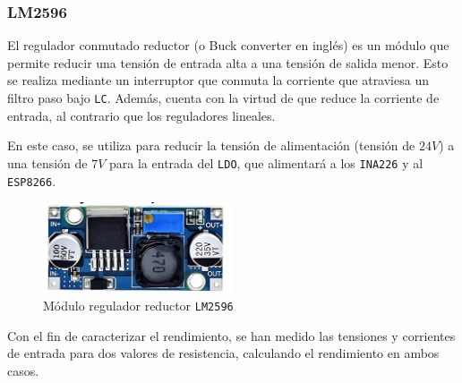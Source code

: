 \subsubsection{LM2596}

El regulador conmutado reductor (o Buck converter en inglés) es un módulo que permite reducir una tensión de entrada alta a una tensión de salida menor. Esto se realiza mediante un interruptor que conmuta la corriente que atraviesa un filtro paso bajo \texttt{LC}. Además, cuenta con la virtud de que reduce la corriente de entrada, al contrario que los reguladores lineales. \cite{texasinstrumentsLM2596SIMPLESWITCHER}

En este caso, se utiliza para reducir la tensión de alimentación (tensión de $24 V$) a una tensión de $7 V$ para la entrada del \texttt{LDO}, que alimentará a los \texttt{INA226} y al \texttt{ESP8266}.

\begin{figure}[H]
    \centering
    \includegraphics[width=0.5\textwidth]{images/2-hardware/componentes/LM2596.png}
    \caption{Módulo regulador reductor \texttt{LM2596}}
    \label{fig:hardware/modulos/lm2596}
\end{figure}

Con el fin de caracterizar el rendimiento, se han medido las tensiones y corrientes de entrada para dos valores de resistencia, calculando el rendimiento en ambos casos.


